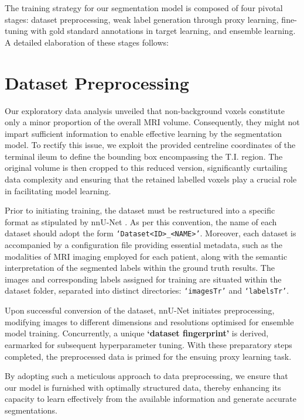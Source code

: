 The training strategy for our segmentation model is composed of four pivotal stages: dataset preprocessing, weak label generation through proxy learning, fine-tuning with gold standard annotations in target learning, and ensemble learning. A detailed elaboration of these stages follows:

\section{Dataset Preprocessing}

Our exploratory data analysis unveiled that non-background voxels constitute only a minor proportion of the overall MRI volume. Consequently, they might not impart sufficient information to enable effective learning by the segmentation model. To rectify this issue, we exploit the provided centreline coordinates of the terminal ileum to define the bounding box encompassing the T.I. region. The original volume is then cropped to this reduced version, significantly curtailing data complexity and ensuring that the retained labelled voxels play a crucial role in facilitating model learning.

Prior to initiating training, the dataset must be restructured into a specific format as stipulated by nnU-Net \cite{isensee2021nnu}. As per this convention, the name of each dataset should adopt the form \texttt{`Dataset<ID>\_<NAME>'}. Moreover, each dataset is accompanied by a configuration file providing essential metadata, such as the modalities of MRI imaging employed for each patient, along with the semantic interpretation of the segmented labels within the ground truth results. The images and corresponding labels assigned for training are situated within the dataset folder, separated into distinct directories: \texttt{`imagesTr'} and \texttt{`labelsTr'}.

Upon successful conversion of the dataset, nnU-Net initiates preprocessing, modifying images to different dimensions and resolutions optimised for ensemble model training. Concurrently, a unique \textbf{`dataset fingerprint'} is derived, earmarked for subsequent hyperparameter tuning. With these preparatory steps completed, the preprocessed data is primed for the ensuing proxy learning task.

By adopting such a meticulous approach to data preprocessing, we ensure that our model is furnished with optimally structured data, thereby enhancing its capacity to learn effectively from the available information and generate accurate segmentations.

